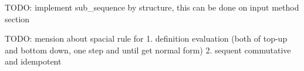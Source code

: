 \documentclass[11pt, a4paper]{article}
\begin{document}

    TODO: implement sub\_sequence by structure, this can be done on input method section

    TODO: mension about spacial rule for
    1. definition evaluation (both of top-up and bottom down, one step and until get normal form)
    2. sequent commutative and idempotent


\end{document}
